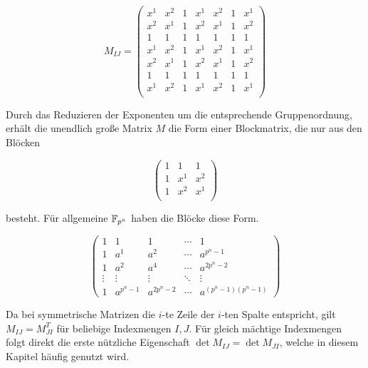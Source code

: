 \begin{equation*}
    M_{IJ} = \begin{pmatrix}
        x^1     & x^{2} & 1     & x^{1} & x^{2} & 1 & x^{1} \\
        x^{2}   & x^{1} & 1     & x^{2} & x^{1} & 1 & x^{2} \\
        1       & 1     & 1     & 1     & 1     & 1 & 1     \\
        x^{1}   & x^{2} & 1     & x^{1} & x^{2} & 1 & x^{1} \\
        x^{2}   & x^{1} & 1     & x^{2} & x^{1} & 1 & x^{2} \\
        1       & 1     & 1     & 1     & 1     & 1 & 1     \\
        x^1     & x^2   & 1     & x^1   & x^2   & 1 & x^1   \\
    \end{pmatrix}
\end{equation*}

Durch das Reduzieren der Exponenten um die entsprechende Gruppenordnung, erhält die unendlich große Matrix $M$ die Form einer Blockmatrix, die nur aus den Blöcken

\begin{equation*}
    \begin{pmatrix}
        1     & 1     & 1     \\
        1     & x^{1} & x^{2} \\
        1     & x^{2} & x^{1} \\
    \end{pmatrix}
\end{equation*}

besteht. Für allgemeine $\field{p}[n]$ haben die Blöcke diese Form.

\begin{equation*}
    \begin{pmatrix}
        1     & 1       & 1         &\cdots & 1 \\
        1     & a^1     & a^2       &\cdots & a^{p^n-1} \\
        1     & a^2     & a^4       &\cdots & a^{2p^n-2} \\
        \vdots&\vdots   &\vdots     &\ddots &\vdots \\
        1     &a^{p^n-1}&a^{2p^n-2} &\cdots &a^{(p^n-1)(p^n-1)}
    \end{pmatrix}
\end{equation*}

Da bei symmetrische Matrizen die $i$-te Zeile der $i$-ten Spalte entspricht, gilt $M_{IJ} = M_{JI}^T$ für beliebige Indexmengen $I,J$. Für gleich mächtige Indexmengen folgt direkt die erste nützliche Eigenschaft $\det M_{IJ} = \det M_{JI}$, welche in diesem Kapitel häufig genutzt wird.

